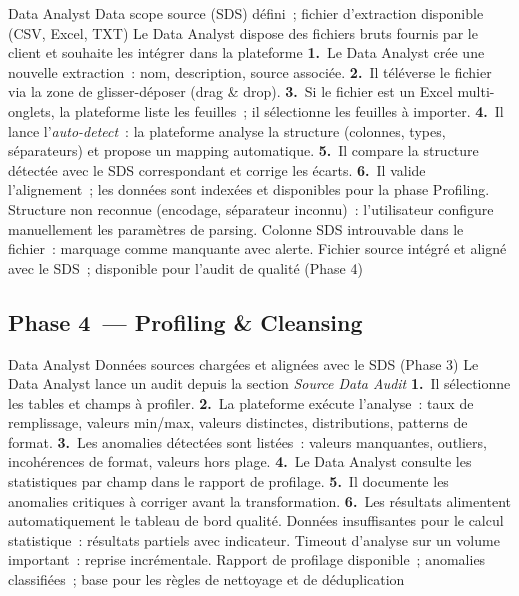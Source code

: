   {Data Analyst}
  {Data scope source (SDS) défini~; fichier d'extraction disponible (CSV, Excel, TXT)}
  {Le Data Analyst dispose des fichiers bruts fournis par le client et souhaite les intégrer dans la plateforme}
  {\textbf{1.}~Le Data Analyst crée une nouvelle extraction~: nom, description, source associée.\newline
   \textbf{2.}~Il téléverse le fichier via la zone de glisser-déposer (drag \& drop).\newline
   \textbf{3.}~Si le fichier est un Excel multi-onglets, la plateforme liste les feuilles~; il sélectionne les feuilles à importer.\newline
   \textbf{4.}~Il lance l'\textit{auto-detect}~: la plateforme analyse la structure (colonnes, types, séparateurs) et propose un mapping automatique.\newline
   \textbf{5.}~Il compare la structure détectée avec le SDS correspondant et corrige les écarts.\newline
   \textbf{6.}~Il valide l'alignement~; les données sont indexées et disponibles pour la phase Profiling.}
  {Structure non reconnue (encodage, séparateur inconnu)~: l'utilisateur configure manuellement les paramètres de parsing. Colonne SDS introuvable dans le fichier~: marquage comme manquante avec alerte.}
  {Fichier source intégré et aligné avec le SDS~; disponible pour l'audit de qualité (Phase 4)}

\subsection*{Phase 4~--- Profiling \& Cleansing}

  {Data Analyst}
  {Données sources chargées et alignées avec le SDS (Phase 3)}
  {Le Data Analyst lance un audit depuis la section \textit{Source Data Audit}}
  {\textbf{1.}~Il sélectionne les tables et champs à profiler.\newline
   \textbf{2.}~La plateforme exécute l'analyse~: taux de remplissage, valeurs min/max, valeurs distinctes, distributions, patterns de format.\newline
   \textbf{3.}~Les anomalies détectées sont listées~: valeurs manquantes, outliers, incohérences de format, valeurs hors plage.\newline
   \textbf{4.}~Le Data Analyst consulte les statistiques par champ dans le rapport de profilage.\newline
   \textbf{5.}~Il documente les anomalies critiques à corriger avant la transformation.\newline
   \textbf{6.}~Les résultats alimentent automatiquement le tableau de bord qualité.}
  {Données insuffisantes pour le calcul statistique~: résultats partiels avec indicateur. Timeout d'analyse sur un volume important~: reprise incrémentale.}
  {Rapport de profilage disponible~; anomalies classifiées~; base pour les règles de nettoyage et de déduplication}

